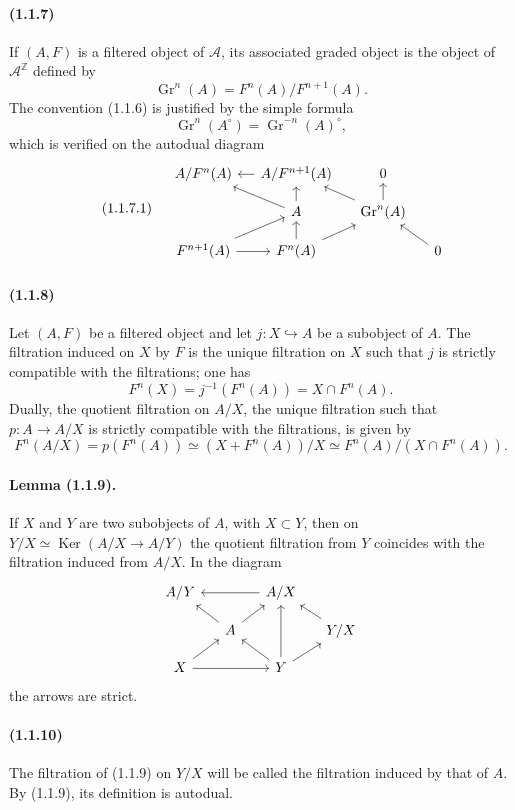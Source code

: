 \documentclass[10pt]{article}
\newcommand{\Z}{\mathbb Z}
\newcommand{\Gr}{\operatorname{Gr}}
\newcommand{\Ker}{\operatorname{Ker}}
\newcommand{\calA}{\mathcal A}
\begin{document}
\paragraph{(1.1.7)} If $(A,F)$ is a filtered object of $\calA$, its associated graded object is the object of $\calA^{\Z}$ defined by
\[
\Gr^n(A)=F^n(A)/F^{n+1}(A).
\]
The convention (1.1.6) is justified by the simple formula
\[
\Gr^n(A^{\circ})=\Gr^{-n}(A)^{\circ},
\]
which is verified on the autodual diagram
\begin{equation}\tag{1.1.7.1}
\begin{tikzcd}[column sep=1.2em,row sep=1.0em]
& A/F^n(A) & A/F^{n+1}(A) \arrow[l] & 0 \\
& & A \arrow[ul] \arrow[u] & \Gr^n(A) \arrow[ul] \arrow[u] \\
& F^{n+1}(A) \arrow[r] \arrow[ur] & F^n(A) \arrow[u] \arrow[ur] & & 0 \arrow[ul]
\end{tikzcd}
\end{equation}

\paragraph{(1.1.8)} Let $(A,F)$ be a filtered object and let $j:X\hookrightarrow A$ be a subobject of $A$. The filtration induced on $X$ by $F$ is the unique filtration on $X$ such that $j$ is strictly compatible with the filtrations; one has
\[
F^n(X)=j^{-1}(F^n(A))=X\cap F^n(A).
\]
Dually, the quotient filtration on $A/X$, the unique filtration such that $p:A\to A/X$ is strictly compatible with the filtrations, is given by
\[
F^n(A/X)=p(F^n(A))\simeq (X+F^n(A))/X\simeq F^n(A)/(X\cap F^n(A)).
\]

\paragraph{Lemma (1.1.9).} If $X$ and $Y$ are two subobjects of $A$, with $X\subset Y$, then on $Y/X\simeq\Ker(A/X\to A/Y)$ the quotient filtration from $Y$ coincides with the filtration induced from $A/X$. In the diagram
\[
\begin{tikzcd}[column sep=1.3em,row sep=1.0em]
A/Y && A/X \arrow[ll] & \\
& A \arrow[ul] \arrow[ur] && Y/X \arrow[ul] \\
X \arrow[ur] \arrow[rr] && Y \arrow[ul] \arrow[uu] \arrow[ur] &
\end{tikzcd}
\]
the arrows are strict.

\paragraph{(1.1.10)} The filtration of (1.1.9) on $Y/X$ will be called the filtration induced by that of $A$. By (1.1.9), its definition is autodual.
\end{document}
